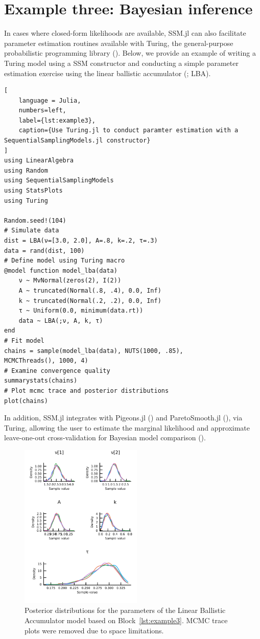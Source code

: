 \documentclass{juliacon}
\begin{document}
\section{Example three: Bayesian inference}

In cases where closed-form likelihoods are available, SSM.jl can also facilitate parameter estimation routines available with Turing, the general-purpose probabilistic programming library (\cite{ge2018t}). Below, we provide an example of writing a Turing model using a SSM constructor and conducting a simple parameter estimation exercise
using the linear ballistic accumulator (\cite{brown2008simplest}; LBA).

\begin{lstlisting}[
    language = Julia, 
    numbers=left, 
    label={lst:example3},  
    caption={Use Turing.jl to conduct paramter estimation with a SequentialSamplingModels.jl constructor}
]
using LinearAlgebra
using Random
using SequentialSamplingModels
using StatsPlots
using Turing

Random.seed!(104)
# Simulate data
dist = LBA(ν=[3.0, 2.0], A=.8, k=.2, τ=.3)
data = rand(dist, 100)
# Define model using Turing macro
@model function model_lba(data)
    ν ~ MvNormal(zeros(2), I(2))
    A ~ truncated(Normal(.8, .4), 0.0, Inf)
    k ~ truncated(Normal(.2, .2), 0.0, Inf)
    τ ~ Uniform(0.0, minimum(data.rt))
    data ~ LBA(;ν, A, k, τ)
end
# Fit model
chains = sample(model_lba(data), NUTS(1000, .85), 
MCMCThreads(), 1000, 4)
# Examine convergence quality
summarystats(chains)
# Plot mcmc trace and posterior distributions
plot(chains)
\end{lstlisting}

In addition, SSM.jl integrates with Pigeons.jl (\citep{surjanovic2023pigeons}) and ParetoSmooth.jl (\cite{ParetoSmooth.jl}), via Turing, allowing the user to estimate the marginal likelihood and approximate leave-one-out cross-validation for Bayesian model comparison (\cite{Vehtari2017}).

\begin{figure}[!htp]
\includegraphics[height=300px,width=220px]{paper/figures/posterior_distributions.png}
 \caption{Posterior distributions for the parameters of the Linear Ballistic Accumulator model based on  Block~\ref{lst:example3}. MCMC trace plots were removed due to space limitations.} 
 \label{fig:lba_posterior}
\end{figure}
\end{document}
